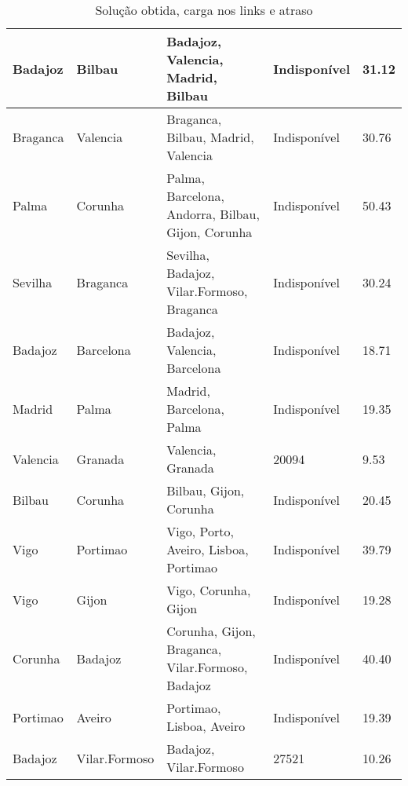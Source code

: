 \begin{table}[!htb]
{\begin{tabular}{|l|l|l|l|l|}
Badajoz & Bilbau & Badajoz, Valencia, Madrid, Bilbau & Indisponível & 31.12 \\ \hline
Braganca & Valencia & Braganca, Bilbau, Madrid, Valencia & Indisponível & 30.76 \\ \hline
Palma & Corunha & Palma, Barcelona, Andorra, Bilbau, Gijon, Corunha & Indisponível & 50.43 \\ \hline
Sevilha & Braganca & Sevilha, Badajoz, Vilar.Formoso, Braganca & Indisponível & 30.24 \\ \hline
Badajoz & Barcelona & Badajoz, Valencia, Barcelona & Indisponível & 18.71 \\ \hline
Madrid & Palma & Madrid, Barcelona, Palma & Indisponível & 19.35 \\ \hline
Valencia & Granada & Valencia, Granada & 20094 & 9.53 \\ \hline
Bilbau & Corunha & Bilbau, Gijon, Corunha & Indisponível & 20.45 \\ \hline
Vigo & Portimao & Vigo, Porto, Aveiro, Lisboa, Portimao & Indisponível & 39.79 \\ \hline
Vigo & Gijon & Vigo, Corunha, Gijon & Indisponível & 19.28 \\ \hline
Corunha & Badajoz & Corunha, Gijon, Braganca, Vilar.Formoso, Badajoz & Indisponível & 40.40 \\ \hline
Portimao & Aveiro & Portimao, Lisboa, Aveiro & Indisponível & 19.39 \\ \hline
Badajoz & Vilar.Formoso & Badajoz, Vilar.Formoso & 27521 & 10.26 \\ \hline
\end{tabular}}
\caption[]{Solução obtida, carga nos links e atraso}
\end{table}

